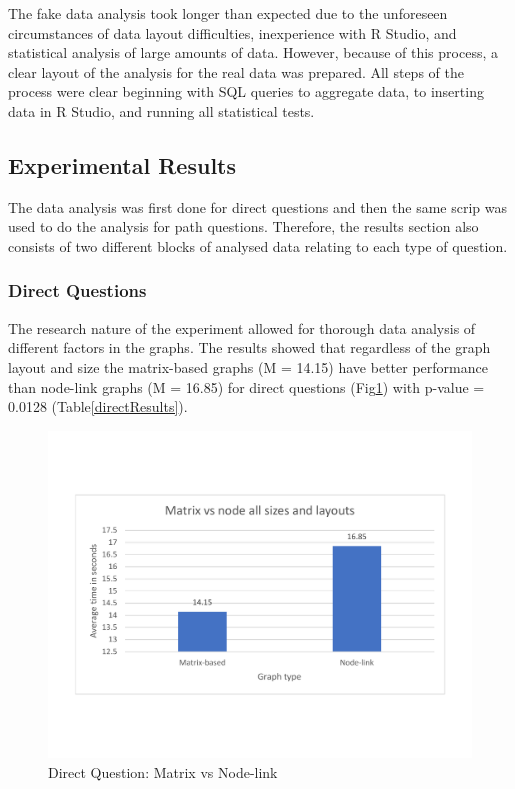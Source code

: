 \documentclass{l4proj}
\begin{document}
The fake data analysis took longer than expected due to the unforeseen circumstances of data layout difficulties, inexperience with R Studio, and statistical analysis of large amounts of data. However, because of this process, a clear layout of the analysis for the real data was prepared. All steps of the process were clear beginning with SQL queries to aggregate data, to inserting data in R Studio, and running all statistical tests.

\subsection{Experimental Results}

The data analysis was first done for direct questions and then the same scrip was used to do the analysis for path questions. Therefore, the results section also consists of two different blocks of analysed data relating to each type of question.

\subsubsection{Direct Questions}

The research nature of the experiment allowed for thorough data analysis of different factors in the graphs. The results showed that regardless of the graph layout and size the matrix-based graphs (M = 14.15) have better performance than node-link graphs (M = 16.85) for direct questions (Fig\ref{nodevsmatrixdirect}) with p-value = 0.0128 (Table\ref{directResults}). 

\begin{figure}[H]
\centering
\includegraphics[width=15cm]{nodevsmatrixdirect.pdf}
\caption{Direct Question: Matrix vs Node-link}
\label{nodevsmatrixdirect}
\end{figure}
\end{document}
